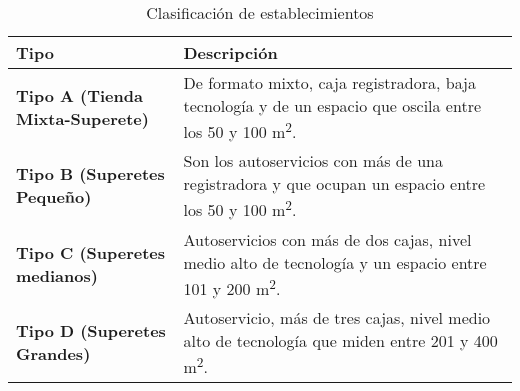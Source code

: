 \newpage

\begin{table}[h]
\centering
\caption{Clasificación de establecimientos}
\label{tab:tipos}
\begin{tabular}{>{\bfseries}l p{10cm}}
\toprule
\textbf{Tipo} & \textbf{Descripción} \\
\midrule
Tipo A (Tienda Mixta-Superete) & De formato mixto, caja registradora, baja tecnología y de un espacio que oscila entre los 50 y 100 m\textsuperscript{2}. \\
\addlinespace
Tipo B (Superetes Pequeño) & Son los autoservicios con más de una registradora y que ocupan un espacio entre los 50 y 100 m\textsuperscript{2}. \\
\addlinespace
Tipo C (Superetes medianos) & Autoservicios con más de dos cajas, nivel medio alto de tecnología y un espacio entre 101 y 200 m\textsuperscript{2}. \\
\addlinespace
Tipo D (Superetes Grandes) & Autoservicio, más de tres cajas, nivel medio alto de tecnología que miden entre 201 y 400 m\textsuperscript{2}. \\
\bottomrule
\end{tabular}
\end{table}